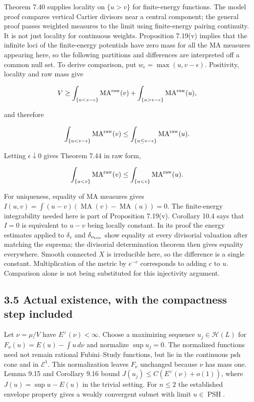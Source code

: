 \documentclass[
  11pt,
]{article}
\begin{document}
Theorem 7.40 supplies locality on \(\{u>v\}\) for finite-energy
functions. The model proof compares vertical Cartier divisors near a
central component; the general proof passes weighted measures to the
limit using finite-energy pairing continuity. It is not just locality
for continuous weights. Proposition 7.19(v) implies that the infinite
loci of the finite-energy potentials have zero mass for all the MA
measures appearing here, so the following partitions and differences are
interpreted off a common null set. To derive comparison, put
\(w_\epsilon=\max(u,v-\epsilon)\). Positivity, locality and raw mass
give

\[V\geq\int_{\{u<v-\epsilon\}}\operatorname{MA}^{\rm raw}(v)+\int_{\{u>v-\epsilon\}}\operatorname{MA}^{\rm raw}(u),\]

and therefore

\[\int_{\{u<v-\epsilon\}}\operatorname{MA}^{\rm raw}(v)\leq\int_{\{u\leq v-\epsilon\}}\operatorname{MA}^{\rm raw}(u).\]

Letting \(\epsilon\downarrow0\) gives Theorem 7.44 in raw form,

\[\int_{\{u<v\}}\operatorname{MA}^{\rm raw}(v)\leq\int_{\{u<v\}}\operatorname{MA}^{\rm raw}(u).\]

For uniqueness, equality of MA measures gives
\(I(u,v)=\int(u-v)(\operatorname{MA}(v)-\operatorname{MA}(u))=0\). The
finite-energy integrability needed here is part of Proposition 7.19(v).
Corollary 10.4 says that \(I=0\) is equivalent to \(u-v\) being locally
constant. In its proof the energy estimates applied to \(\delta_{v}\)
and \(\delta_{v_{\rm triv}}\) show equality at every divisorial
valuation after matching the suprema; the divisorial determination
theorem then gives equality everywhere. Smooth connected \(X\) is
irreducible here, so the difference is a single constant. Multiplication
of the metric by \(e^{-c}\) corresponds to adding \(c\) to \(u\).
Comparison alone is not being substituted for this injectivity argument.

\subsection{3.5 Actual existence, with the compactness step
included}\label{actual-existence-with-the-compactness-step-included}

Let \(\nu=\mu/V\) have \(E^\vee(\nu)<\infty\). Choose a maximizing
sequence \(u_j\in\mathcal H(L)\) for \(F_\nu(u)=E(u)-\int u\,d\nu\) and
normalize \(\sup u_j=0\). The normalized functions need not remain
rational Fubini--Study functions, but lie in the continuous psh cone and
in \(\mathcal E^1\). This normalization leaves \(F_\nu\) unchanged
because \(\nu\) has mass one. Lemma 9.15 and Corollary 9.16 bound
\(J(u_j)\leq C(E^\vee(\nu)+o(1))\), where \(J(u)=\sup u-E(u)\) in the
trivial setting. For \(n\leq2\) the established envelope property gives
a weakly convergent subnet with limit \(u\in\operatorname{PSH}\).
\end{document}
